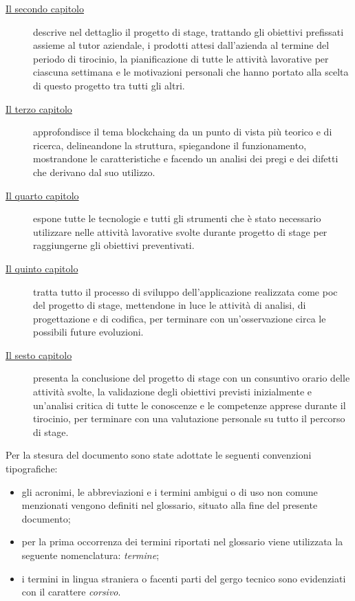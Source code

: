 \begin{description}
    \item[{\hyperref[cap:stage]{Il secondo capitolo}}] descrive nel dettaglio il progetto di stage, trattando gli obiettivi prefissati assieme al tutor aziendale, i prodotti attesi dall'azienda al termine del periodo di tirocinio, la pianificazione di tutte le attività lavorative per ciascuna settimana e le motivazioni personali che hanno portato alla scelta di questo progetto tra tutti gli altri.
    
    \item[{\hyperref[cap:blockchain]{Il terzo capitolo}}] approfondisce il tema \gls{blockchaing} da un punto di vista più teorico e di ricerca, delineandone la struttura, spiegandone il funzionamento, mostrandone le caratteristiche e facendo un analisi dei pregi e dei difetti che derivano dal suo utilizzo.
    
    \item[{\hyperref[cap:tecnologie-strumenti]{Il quarto capitolo}}] espone tutte le tecnologie e tutti gli strumenti che è stato necessario utilizzare nelle attività lavorative svolte durante progetto di stage per raggiungerne gli obiettivi preventivati.
    
    \item[{\hyperref[cap:applicazione]{Il quinto capitolo}}] tratta tutto il processo di sviluppo dell'applicazione realizzata come \gls{poc} del progetto di stage, mettendone in luce le attività di analisi, di progettazione e di codifica, per terminare con un'osservazione circa le possibili future evoluzioni.
    
    \item[{\hyperref[cap:conclusioni]{Il sesto capitolo}}] presenta la conclusione del progetto di stage con un consuntivo orario delle attività svolte, la validazione degli obiettivi previsti inizialmente e un'analisi critica di tutte le conoscenze e le competenze apprese durante il tirocinio, per terminare con una valutazione personale su tutto il percorso di stage.
\end{description}

Per la stesura del documento sono state adottate le seguenti convenzioni tipografiche:

\begin{itemize}
	\item gli acronimi, le abbreviazioni e i termini ambigui o di uso non comune menzionati vengono definiti nel glossario, situato alla fine del presente documento;
	\item per la prima occorrenza dei termini riportati nel glossario viene utilizzata la seguente nomenclatura: \emph{termine}\glsfirstoccur;
	\item i termini in lingua straniera o facenti parti del gergo tecnico sono evidenziati con il carattere \emph{corsivo}.
\end{itemize}
